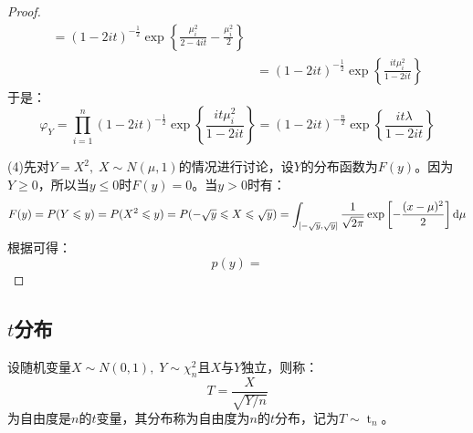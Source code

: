 \begin{proof}
\begin{align*}
		=(1-2it)^{-\frac{1}{2}}\exp\left\{\frac{\mu_i^2}{2-4it}-\frac{\mu_i^2}{2}\right\} \\
		&=(1-2it)^{-\frac{1}{2}}\exp\left\{\frac{it\mu_i^2}{1-2it}\right\}
	\end{align*}
	于是：
	\begin{equation*}
		\varphi_{Y}=\prod_{i=1}^n(1-2it)^{-\frac{1}{2}}\exp\left\{\frac{it\mu_i^2}{1-2it}\right\}=(1-2it)^{-\frac{n}{2}}\exp\left\{\frac{it\lambda}{1-2it}\right\}
	\end{equation*}\par
	(4)先对$Y=X^2,\;X\sim N(\mu,1)$的情况进行讨论，设$Y$的分布函数为$F(y)$。因为$Y\geqslant0$，所以当$y\leqslant0$时$F(y)=0$。当$y>0$时有：
	\begin{equation*}
		F(y)=P(Y\leqslant y)=P(X^2\leqslant y)=P(-\sqrt{y}\leqslant X\leqslant\sqrt{y})=\int_{[-\sqrt{y},\sqrt{y}]}\frac{1}{\sqrt{2\pi}}\exp\left[-\frac{(x-\mu)^2}{2}\right]\mathop{}\!\mathrm{d}\mu
	\end{equation*}
	根据可得：
	\begin{equation*}
		p(y)=
	\end{equation*}
\end{proof}

\subsection{$t$分布}
\begin{definition}
	设随机变量$X\sim N(0,1),\;Y\sim\chi_n^2$且$X$与$Y$独立，则称：
	\begin{equation*}
		T=\frac{X}{\sqrt{Y/ n}}
	\end{equation*}
	为自由度是$n$的$t$变量，其分布称为自由度为$n$的$t$分布，记为$T\sim \operatorname{t}_n$。
\end{definition}

